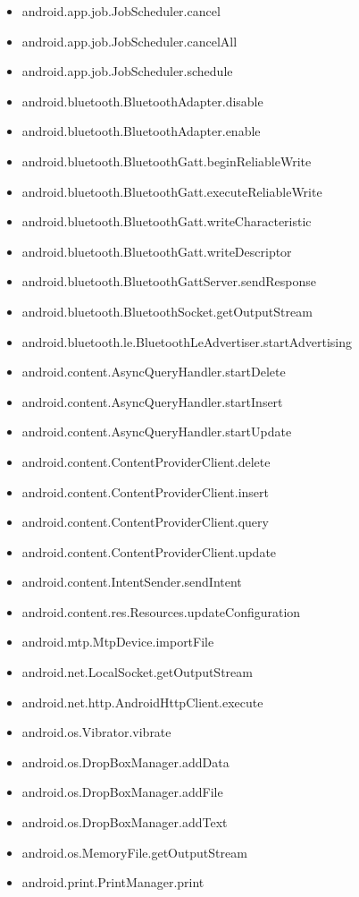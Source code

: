 \documentclass{sig-alternate}
\begin{document}
\begin{itemize}
\item android.app.job.JobScheduler.cancel
\item android.app.job.JobScheduler.cancelAll
\item android.app.job.JobScheduler.schedule
\item android.bluetooth.BluetoothAdapter.disable
\item android.bluetooth.BluetoothAdapter.enable
\item android.bluetooth.BluetoothGatt.beginReliableWrite
\item android.bluetooth.BluetoothGatt.executeReliableWrite
\item android.bluetooth.BluetoothGatt.writeCharacteristic
\item android.bluetooth.BluetoothGatt.writeDescriptor
\item android.bluetooth.BluetoothGattServer.sendResponse
\item android.bluetooth.BluetoothSocket.getOutputStream
\item android.bluetooth.le.BluetoothLeAdvertiser.startAdvertising
\item android.content.AsyncQueryHandler.startDelete
\item android.content.AsyncQueryHandler.startInsert
\item android.content.AsyncQueryHandler.startUpdate
\item android.content.ContentProviderClient.delete
\item android.content.ContentProviderClient.insert
\item android.content.ContentProviderClient.query
\item android.content.ContentProviderClient.update
\item android.content.IntentSender.sendIntent
\item android.content.res.Resources.updateConfiguration
\item android.mtp.MtpDevice.importFile
\item android.net.LocalSocket.getOutputStream
\item android.net.http.AndroidHttpClient.execute
\item android.os.Vibrator.vibrate
\item android.os.DropBoxManager.addData
\item android.os.DropBoxManager.addFile
\item android.os.DropBoxManager.addText
\item android.os.MemoryFile.getOutputStream
\item android.print.PrintManager.print

\end{itemize}
\end{document}
